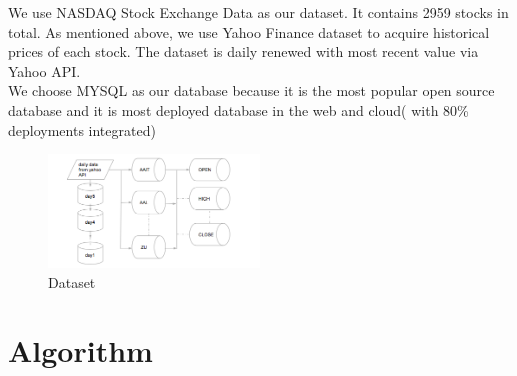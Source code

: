 \documentclass[10pt, conference, compsocconf]{IEEEtran}
\begin{document}
\begin{enumerate}[label=\Alph*]
We use NASDAQ Stock Exchange Data as our dataset. It contains 2959 stocks in total. As mentioned above, we use Yahoo Finance dataset to acquire historical prices of each stock. The dataset is daily renewed  with most recent value via Yahoo API.\\
           We choose MYSQL as our database because it is the most popular open source database and it is most deployed database in the web and cloud( with 80\% deployments integrated)
   \begin{figure}[!h]
            \centering
           \includegraphics[width=0.5\textwidth]{figures/dataset.jpg}
           \caption{Dataset}
          \vspace{0.1cm}
    \end{figure}

    
 \end{enumerate}

\section{Algorithm} 
\end{document}
